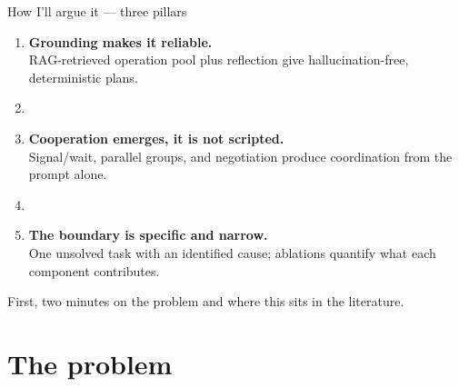 \documentclass[aspectratio=169,11pt]{beamer}
\begin{document}
\begin{frame}{How I'll argue it --- three pillars}
	\begin{enumerate}
		\item[\textbf{1.}] \textbf{Grounding makes it reliable.}\\
		      \small RAG-retrieved operation pool plus reflection give hallucination-free, deterministic plans.
		\item[]\vspace{0.3em}
		\item[\textbf{2.}] \textbf{Cooperation emerges, it is not scripted.}\\
		      \small Signal/wait, parallel groups, and negotiation produce coordination from the prompt alone.
		\item[]\vspace{0.3em}
		\item[\textbf{3.}] \textbf{The boundary is specific and narrow.}\\
		      \small One unsolved task with an identified cause; ablations quantify what each component contributes.
	\end{enumerate}
	\vfill
	\footnotesize First, two minutes on the problem and where this sits in the literature.
\end{frame}

\section{The problem}
\end{document}
